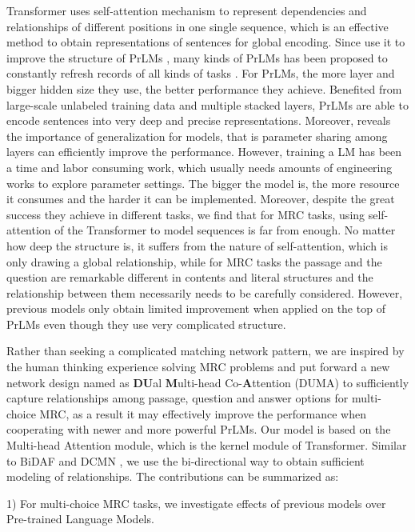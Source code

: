 \documentclass[letterpaper]{article} \usepackage{aaai21}  \usepackage{times}  \usepackage{helvet} \usepackage{courier}  \usepackage[hyphens]{url}  \usepackage{graphicx} \urlstyle{rm} \def\UrlFont{\rm}  \usepackage{natbib}  \usepackage{caption} \frenchspacing  \setlength{\pdfpagewidth}{8.5in}  \setlength{\pdfpageheight}{11in}
\begin{document}
Transformer \cite{transformer} uses self-attention mechanism to represent dependencies and relationships of different positions in one single sequence, which is an effective method to obtain representations of sentences for global encoding. Since \cite{gpt,bert} use it to improve the structure of PrLMs \cite{elmo}, many kinds of PrLMs has been proposed to constantly refresh records of all kinds of tasks \cite{roberta,albert}. For PrLMs, the more layer and bigger hidden size they use, the better performance they achieve. Benefited from large-scale unlabeled training data and multiple stacked layers, PrLMs are able to encode sentences into very deep and precise representations. Moreover, \cite{albert} reveals the importance of generalization for models, that is parameter sharing among layers can efficiently improve the performance. However, training a LM has been a time and labor consuming work, which usually needs amounts of engineering works to explore parameter settings. The bigger the model is, the more resource it consumes and the harder it can be implemented. Moreover, despite the great success they achieve in different tasks, we find that for MRC tasks, using self-attention of the Transformer to model sequences is far from enough. No matter how deep the structure is, it suffers from the nature of self-attention, which is only drawing a global relationship, while for MRC tasks the passage and the question are remarkable different in contents and literal structures and the relationship between them necessarily needs to be carefully considered. However, previous models \cite{nmt_attention,bidaf,dcmn} only obtain limited improvement when applied on the top of PrLMs even though they use very complicated structure.

Rather than seeking a complicated matching network pattern, we are inspired by the human thinking experience solving MRC problems and put forward a new network design named as \textbf{DU}al \textbf{M}ulti-head Co-\textbf{A}ttention (DUMA) to sufficiently capture relationships among passage, question and answer options for multi-choice MRC, as a result it may effectively improve the performance when cooperating with newer and more powerful PrLMs. Our model is based on the Multi-head Attention module, which is the kernel module of Transformer. Similar to BiDAF \cite{bidaf} and DCMN \cite{dcmn}, we use the bi-directional way to obtain sufficient modeling of relationships. The contributions can be summarized as:

1) For multi-choice MRC tasks, we investigate effects of previous models over Pre-trained Language Models.
\end{document}
